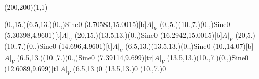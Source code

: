 \unitlength=1bp%

\begin{feynartspicture}(200,200)(1,1)

\FADiagram{}
\FAProp(0.,15.)(6.5,13.)(0.,){Sine}{0}
\FALabel(3.70583,15.0015)[b]{$A|_V$}
\FAProp(0.,5.)(10.,7.)(0.,){Sine}{0}
\FALabel(5.30398,4.9601)[t]{$A|_V$}
\FAProp(20,15.)(13.5,13.)(0.,){Sine}{0}
\FALabel(16.2942,15.0015)[b]{$A|_V$}
\FAProp(20,5.)(10.,7.)(0.,){Sine}{0}
\FALabel(14.696,4.9601)[t]{$A|_V$}
\FAProp(6.5,13.)(13.5,13.)(0.,){Sine}{0}
\FALabel(10.,14.07)[b]{$A|_V$}
\FAProp(6.5,13.)(10.,7.)(0.,){Sine}{0}
\FALabel(7.39114,9.699)[tr]{$A|_V$}
\FAProp(13.5,13.)(10.,7.)(0.,){Sine}{0}
\FALabel(12.6089,9.699)[tl]{$A|_V$}
\FAVert(6.5,13.){0}
\FAVert(13.5,13.){0}
\FAVert(10.,7.){0}
\end{feynartspicture}

